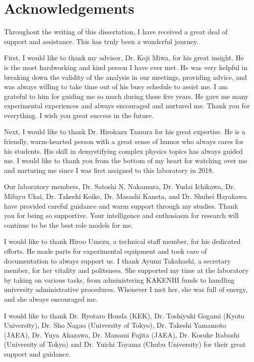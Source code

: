 %

\chapter{Acknowledgements}

Throughout the writing of this dissertation, I have received a great deal of support and assistance. This has truly been a wonderful journey.

First, I would like to thank my advisor, Dr. Koji Miwa, for his great insight. He is the most hardworking and kind person I have ever met. He was very helpful in breaking down the validity of the analysis in our meetings, providing advice, and was always willing to take time out of his busy schedule to assist me. I am grateful to him for guiding me so much during these five years. He gave me many experimental experiences and always encouraged and nurtured me. Thank you for everything. I wish you great success in the future.

Next, I would like to thank Dr. Hirokazu Tamura for his great expertise. He is a friendly, warm-hearted person with a great sense of humor who always cares for his students. His skill in demystifying complex physics topics has always guided me. I would like to thank you from the bottom of my heart for watching over me and nurturing me since I was first assigned to this laboratory in 2018.

Our laboratory members, Dr. Satoshi N. Nakamura, Dr. Yudai Ichikawa, Dr. Mifuyu Ukai, Dr. Takeshi Koike, Dr. Masashi Kaneta, and Dr. Shuhei Hayakawa have provided careful guidance and warm support through my studies. Thank you for being so supportive. Your intelligence and enthusiasm for research will continue to be the best role models for me.

I would like to thank Hiroo Umezu, a technical staff member, for his dedicated efforts. He made parts for experimental equipment and took care of documentation to always support us. I thank Ayumi Takahashi, a secretary member, for her vitality and politeness. She supported my time at the laboratory by taking on various tasks, from administering KAKENHI funds to handling university administrative procedures. Whenever I met her, she was full of energy, and she always encouraged me.

I would like to thank Dr. Ryotaro Honda (KEK), Dr. Toshiyuki Gogami (Kyoto University), Dr. Sho Nagao (University of Tokyo), Dr. Takeshi Yamamoto (JAEA), Dr. Yuya Akazawa, Dr. Manami Fujita (JAEA), Dr. Kosuke Itabashi (University of Tokyo) and Dr. Yuichi Toyama (Chubu University) for their great support and guidance.

